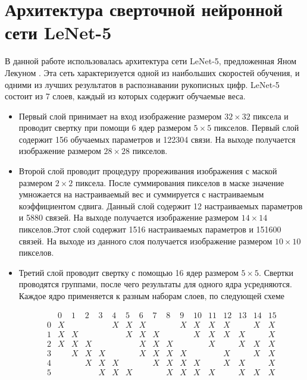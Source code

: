 \documentclass[utf8,usehyperref,14pt]{G7-32}
\begin{document}
\section{Архитектура сверточной нейронной сети LeNet-5}
В данной работе использовалась архитектура сети LeNet-5, предложенная Яном Лекуном \cite{LeCun}. Эта сеть характеризуется одной из наибольших скоростей обучения, и одними из лучших результатов в распознавании рукописных цифр.
LeNet-5 состоит из 7 слоев, каждый из которых содержит обучаемые веса.
\begin{itemize}
\item Первый слой принимает на вход изображение размером $ 32 \times 32 $ пиксела и проводит свертку при помощи 6 ядер размером $ 5 \times 5 $ пикселов. Первый слой содержит 156 обучаемых параметров и 122304 связи. На выходе получается изображение размером $ 28 \times 28 $ пикселов.
\item Второй слой проводит процедуру прореживания изображения с маской размером $ 2 \times 2 $ пиксела. После суммирования пикселов в маске значение умножается на настраиваемый вес и суммируется с настраиваемым коэффициентом сдвига. Данный слой содержит 12 настраиваемых параметров и 5880 связей. На выходе получается изображение размером $ 14 \times 14 $ пикселов.Этот слой содержит 1516 настраиваемых параметров и 151600 связей. На выходе из данного слоя получается изображение размером $ 10 \times 10 $ пикселов.
\item Третий слой проводит свертку с помощью 16 ядер размером $ 5 \times 5 $. Свертки проводятся группами, после чего результаты для одного ядра усредняются. Каждое ядро применяется к разным наборам слоев, по следующей схеме 

\[ \begin{array}{c|cccccccccccccccc}
   & 0 & 1 & 2 & 3 & 4 & 5 & 6 & 7 & 8 & 9 & 10 & 11 & 12 & 13 & 14 & 15\\ \hline
 0 & X &   &   &   & X & X & X &   &   & X & X & X & X &   & X & X \\
 1 & X & X &   &   &   & X & X & X &   &   & X & X & X & X &   & X \\
 2 & X & X & X &   &   &   & X & X & X &   &   & X &   & X & X & X \\ 
 3 &   & X & X & X &   &   & X & X & X & X &   &   & X &   & X & X  \\ 
 4 &   &   & X & X & X &   &   & X & X & X & X &   & X & X &   & X \\ 
 5 &   &   &   & X & X & X &   &   & X & X & X & X &   & X & X & X \end{array} \]



\end{itemize}
\end{document}
